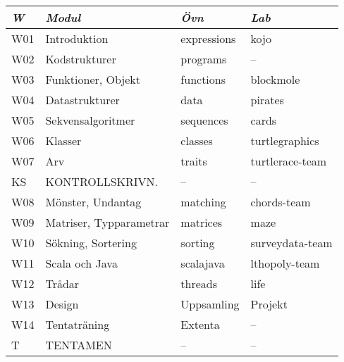 \begin{tabular}{l|l|l|l}
\textit{W} & \textit{Modul} & \textit{Övn} & \textit{Lab} \\ \hline \hline
W01 & Introduktion            & expressions & kojo            \\
W02 & Kodstrukturer           & programs    & --              \\
W03 & Funktioner, Objekt      & functions   & blockmole       \\
W04 & Datastrukturer          & data        & pirates         \\
W05 & Sekvensalgoritmer       & sequences   & cards           \\
W06 & Klasser                 & classes     & turtlegraphics  \\
W07 & Arv                     & traits      & turtlerace-team \\
KS  & KONTROLLSKRIVN.         & --          & --              \\
W08 & Mönster, Undantag       & matching    & chords-team     \\
W09 & Matriser, Typparametrar & matrices    & maze            \\
W10 & Sökning, Sortering      & sorting     & surveydata-team \\
W11 & Scala och Java          & scalajava   & lthopoly-team   \\
W12 & Trådar                  & threads     & life            \\
W13 & Design                  & Uppsamling  & Projekt         \\
W14 & Tentaträning            & Extenta     & --              \\
T   & TENTAMEN                & --          & --              \\
\end{tabular}
